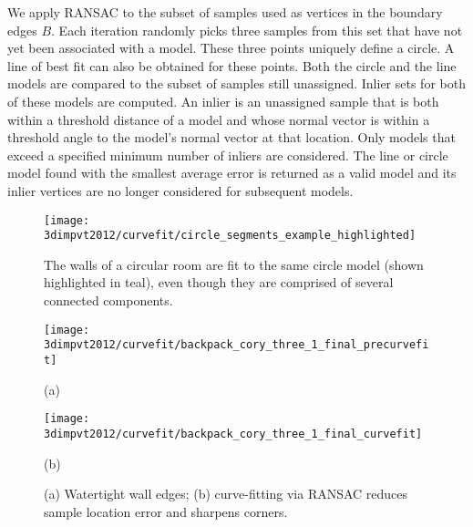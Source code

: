 \documentclass[12pt,onecolumn,oneside]{book}
\begin{document}
We apply RANSAC to the subset of samples used as vertices in the boundary edges $B$.  Each iteration randomly picks three samples from this set that have not yet been associated with a model.  These three points uniquely define a circle.  A line of best fit can also be obtained for these points.  Both the circle and the line models are compared to the subset of samples still unassigned.  Inlier sets for both of these models are computed.  An inlier is an unassigned sample that is both within a threshold distance of a model and whose normal vector is within a threshold angle to the model's normal vector at that location.  Only models that exceed a specified minimum number of inliers are considered.  The line or circle model found with the smallest average error is returned as a valid model and its inlier vertices are no longer considered for subsequent models.

\begin{figure}[t]

\begin{minipage}[b]{1.0\linewidth}
  \centering
  \centerline{\texttt{[image: 3dimpvt2012/curvefit/circle\_segments\_example\_highlighted]}}
\end{minipage}

\caption[Fitting curves to floor plan walls.]{The walls of a circular room are fit to the same circle model (shown highlighted in teal), even though they are comprised of several connected components. }
\label{fig:eigencrust_circle_segments_example}

\end{figure}

\begin{figure}[t]

\begin{minipage}[b]{0.45\linewidth}
  \centering
  \centerline{\texttt{[image: 3dimpvt2012/curvefit/backpack\_cory\_three\_1\_final\_precurvefit]}}
  \centerline{(a)}
\end{minipage}
\hfill
\begin{minipage}[b]{0.45\linewidth}
  \centering
  \centerline{\texttt{[image: 3dimpvt2012/curvefit/backpack\_cory\_three\_1\_final\_curvefit]}}
  \centerline{(b)}
\end{minipage}

\caption[Sharpening floor plan corners with RANSAC.]{(a) Watertight wall edges; (b) curve-fitting via RANSAC reduces sample location error and sharpens corners.}
\label{fig:eigencrust_wall_straightening}

\end{figure}
\end{document}
